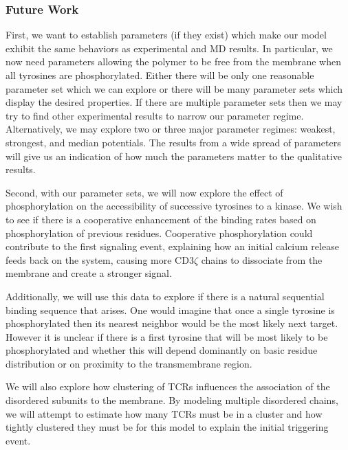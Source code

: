 \documentclass[../../AdvancementSummary.tex]{subfiles}
\begin{document}
\subsubsection{Future Work}

First, we want to establish parameters (if they exist) which make our model exhibit the same behaviors as experimental and MD results. In particular, we now need parameters allowing the polymer to be free from the membrane when all tyrosines are phosphorylated. Either there will be only one reasonable parameter set which we can explore or there will be many parameter sets which display the desired properties.  If there are multiple parameter sets then we may try to find other experimental results to narrow our parameter regime. Alternatively, we may explore two or three major parameter regimes: weakest, strongest, and median potentials. The results from a wide spread of parameters will give us an indication of how much the parameters matter to the qualitative results.  

Second, with our parameter sets, we will now explore the effect of phosphorylation on the accessibility of successive tyrosines to a kinase.  We wish to see if there is a cooperative enhancement of the binding rates based on phosphorylation of previous residues.  Cooperative phosphorylation could contribute to the first signaling event, explaining how an initial calcium release feeds back on the system, causing more CD3$\zeta$ chains to dissociate from the membrane and create a stronger signal. \cite{Shi2013}

Additionally, we will use this data to explore if there is a natural sequential binding sequence that arises.  One would imagine that once a single tyrosine is phosphorylated then its nearest neighbor would be the most likely next target.  However it is unclear if there is a first tyrosine that will be most likely to be phosphorylated and whether this will depend dominantly on basic residue distribution or on proximity to the transmembrane region. 

We will also explore how clustering of TCRs influences the association of the disordered subunits to the membrane. By modeling multiple disordered chains, we will attempt to estimate how many TCRs must be in a cluster and how tightly clustered they must be for this model to explain the initial triggering event.

\end{document}

